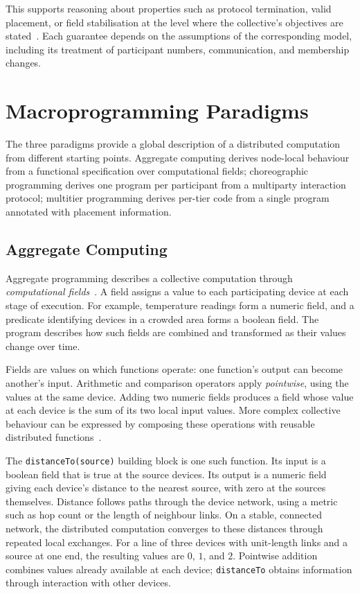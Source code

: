 This supports reasoning about properties such as protocol termination,
valid placement,
or field stabilisation at the level where the collective's objectives are stated~\cite{DBLP:journals/csur/Casadei23}.
Each guarantee depends on the assumptions of the corresponding model,
including its treatment of participant numbers,
communication,
and membership changes.

\section{Macroprogramming Paradigms}
\label{sec:foundational-paradigms}

The three paradigms provide a global description of a distributed computation from different starting points.
%
Aggregate computing derives node-local behaviour from a functional specification over computational fields;
choreographic programming derives one program per participant from a multiparty interaction protocol;
multitier programming derives per-tier code from a single program annotated with placement information.


\subsection{Aggregate Computing}
\label{subsec:aggregate-computing}

Aggregate programming describes a collective computation through \emph{computational fields}~\cite{DBLP:journals/csur/Casadei23,VIROLI2019100486}.
A field assigns a value to each participating device at each stage of execution.
For example,
temperature readings form a numeric field,
and a predicate identifying devices in a crowded area forms a boolean field.
The program describes how such fields are combined and transformed as their values change over time.

Fields are values on which functions operate:
one function's output can become another's input.
Arithmetic and comparison operators apply \emph{pointwise},
using the values at the same device.
Adding two numeric fields produces a field whose value at each device is the sum of its two local input values.
More complex collective behaviour can be expressed by composing these operations with reusable distributed functions~\cite{VIROLI2019100486,DBLP:conf/saso/BealV14a}.

The \texttt{distanceTo(source)} building block is one such function.
Its input is a boolean field that is true at the source devices.
Its output is a numeric field giving each device's distance to the nearest source,
with zero at the sources themselves.
Distance follows paths through the device network,
using a metric such as hop count or the length of neighbour links.
On a stable, connected network,
the distributed computation converges to these distances through repeated local exchanges.
For a line of three devices with unit-length links and a source at one end,
the resulting values are $0$, $1$, and $2$.
Pointwise addition combines values already available at each device;
\texttt{distanceTo} obtains information through interaction with other devices.

